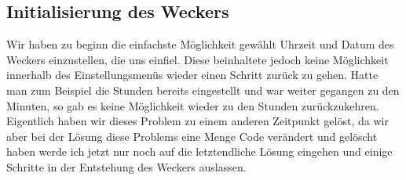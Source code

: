 \documentclass[openright,twoside,12pt,a4paper]{scrartcl}
\begin{document}
\begin{flushleft}
		 \section{Initialisierung des Weckers}
		 Wir haben zu beginn die einfachste Möglichkeit gewählt Uhrzeit und Datum des Weckers einzustellen, die uns einfiel. Diese beinhaltete jedoch keine Möglichkeit innerhalb des Einstellungsmenüs wieder einen Schritt zurück zu gehen. Hatte man zum Beispiel die Stunden bereits eingestellt und war weiter gegangen zu den Minuten, so gab es keine Möglichkeit wieder zu den Stunden zurückzukehren. Eigentlich haben wir dieses Problem zu einem anderen Zeitpunkt gelöst, da wir aber bei der Lösung diese Problems eine Menge Code verändert und gelöscht haben werde ich jetzt nur noch auf die letztendliche Lösung eingehen und einige Schritte in der Entstehung des Weckers auslassen.

\end{flushleft}
\end{document}
